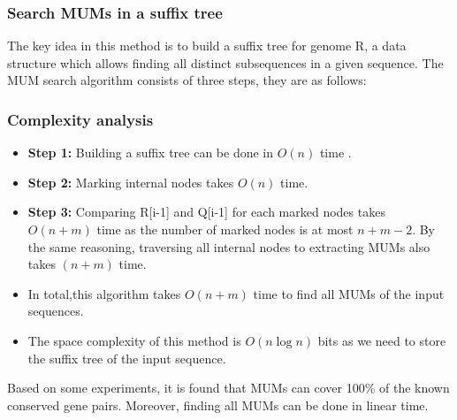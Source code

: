 \documentclass[runningheads,a4paper]{llncs}
\begin{document}
\subsubsection{Search MUMs in a suffix tree} 
The key idea in this method is to build a suffix tree for genome R, a data structure which allows finding all distinct subsequences in a given sequence. The MUM search algorithm consists of three steps, they are as follows:
\begin{algorithmic}
  \ENDIF
  \ENDFOR
\end{algorithmic}
\subsubsection{Complexity analysis} 
\begin{itemize}
  \item \textbf{Step 1:} Building a suffix tree can be done in $O(n)$ time \cite{kurtz}.
  \item \textbf{Step 2:} Marking internal nodes takes $O(n)$ time. 
  \item \textbf{Step 3:} Comparing R[i-1] and Q[i-1] for each marked nodes takes $O(n+m)$ time as the number of marked nodes is at most $n+m-2$. By the same reasoning, traversing all internal nodes to extracting MUMs also takes $(n+m)$ time.
  \item In total,this algorithm takes $O(n+m)$ time to find all MUMs of the input sequences.
  \item The space complexity of this method is $O\left(n\log n\right)$ bits as we need to store the suffix tree of the input sequence.
\end{itemize}
Based on some experiments, it is found that MUMs can cover 100\% of the known conserved gene pairs. Moreover, finding all MUMs can be done in linear time.
\end{document}

